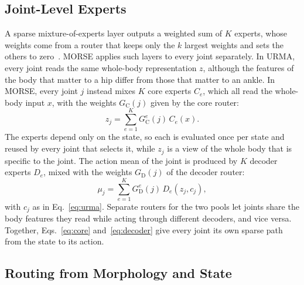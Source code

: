 \subsection{Joint-Level Experts}
\label{sec:experts}

A sparse mixture-of-experts layer outputs a weighted sum of $K$ experts, whose weights come from a router that keeps
only the $k$ largest weights and sets the others to zero~\citep{shazeer2017outrageously}. MORSE applies such layers to
every joint separately. In URMA, every joint reads the same whole-body representation $z$, although the features
of the body that matter to a hip differ from those that matter to an ankle. In MORSE, every joint $j$ instead mixes
$K$ core experts $C_e$, which all read the whole-body input $x$, with the weights $G_{\mathrm{C}}(j)$ given by the
core router:
\begin{equation}
z_j=\sum_{e=1}^{K}G^e_{\mathrm{C}}(j)\,C_e(x).
\label{eq:core}
\end{equation}
The experts depend only on the state, so each is evaluated once per state and reused by every joint that selects it,
while $z_j$ is a view of the whole body that is specific to the joint. The action mean of the joint is produced by
$K$ decoder experts $D_e$, mixed with the weights $G_{\mathrm{D}}(j)$ of the decoder router:
\begin{equation}
\mu_j=\sum_{e=1}^{K}G^e_{\mathrm{D}}(j)\,D_e(z_j,c_j),
\label{eq:decoder}
\end{equation}
with $c_j$ as in Eq.~\eqref{eq:urma}. Separate routers for the two pools let joints share the body features they read
while acting through different decoders, and vice versa. Together, Eqs.~\eqref{eq:core} and~\eqref{eq:decoder} give
every joint its own sparse path from the state to its action.

\subsection{Routing from Morphology and State}
\label{sec:routing}

